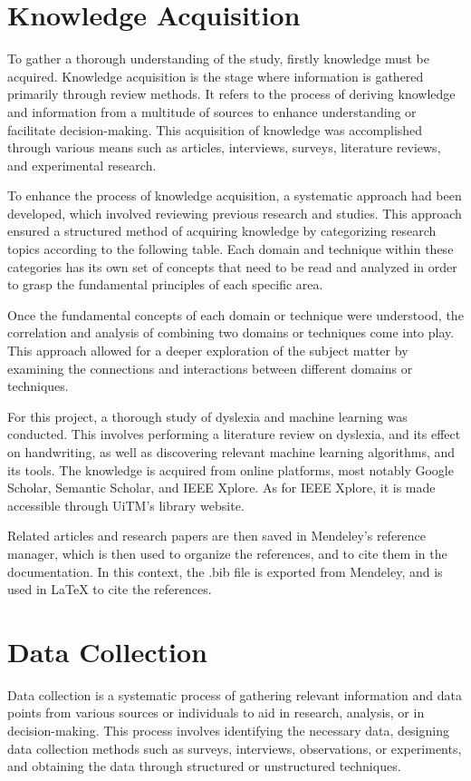 \newpage
\section{Knowledge Acquisition}
To gather a thorough understanding of the study, firstly knowledge must be acquired. Knowledge acquisition is the stage where information is gathered primarily through review methods. It refers to the process of deriving knowledge and information from a multitude of sources to enhance understanding or facilitate decision-making. This acquisition of knowledge was accomplished through various means such as articles, interviews, surveys, literature reviews, and experimental research.

To enhance the process of knowledge acquisition, a systematic approach had been developed, which involved reviewing previous research and studies. This approach ensured a structured method of acquiring knowledge by categorizing research topics according to the following table. Each domain and technique within these categories has its own set of concepts that need to be read and analyzed in order to grasp the fundamental principles of each specific area. 

Once the fundamental concepts of each domain or technique were understood, the correlation and analysis of combining two domains or techniques come into play. This approach allowed for a deeper exploration of the subject matter by examining the connections and interactions between different domains or techniques.

For this project, a thorough study of dyslexia and machine learning was conducted. This involves performing a literature review on dyslexia, and its effect on handwriting, as well as discovering relevant machine learning algorithms, and its tools. The knowledge is acquired from online platforms, most notably Google Scholar, Semantic Scholar, and IEEE Xplore. As for IEEE Xplore, it is made accessible through UiTM's library website.

Related articles and research papers are then saved in Mendeley's reference manager, which is then used to organize the references, and to cite them in the documentation. In this context, the .bib file is exported from Mendeley, and is used in LaTeX to cite the references.



\newpage
\section{Data Collection}
Data collection is a systematic process of gathering relevant information and data points from various sources or individuals to aid in research, analysis, or in decision-making. This process involves identifying the necessary data, designing data collection methods such as surveys, interviews, observations, or experiments, and obtaining the data through structured or unstructured techniques. 

